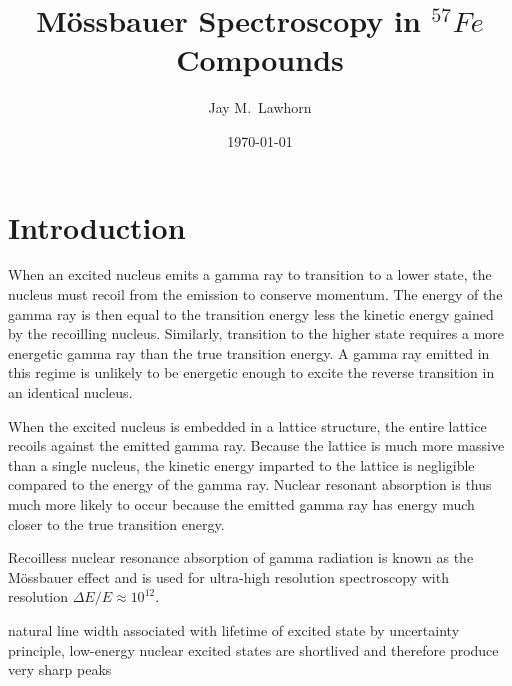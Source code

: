 \newcommand{\cd}{$\cdot$}

%
%


\title{M{\"o}ssbauer Spectroscopy in $^{57}Fe$ Compounds}
\author{Jay M.\ Lawhorn}
\date{\today}

\begin{abstract}

\end{abstract}

\maketitle


\section{Introduction}

When an excited nucleus emits a gamma ray to transition to a lower state, the nucleus must recoil from the emission to conserve momentum. The energy of the gamma ray is then equal to the transition energy less the kinetic energy gained by the recoilling nucleus. Similarly, transition to the higher state requires a more energetic gamma ray than the true transition energy. A gamma ray emitted in this regime is unlikely to be energetic enough to excite the reverse transition in an identical nucleus.

When the excited nucleus is embedded in a lattice structure, the entire lattice recoils against the emitted gamma ray. Because the lattice is much more massive than a single nucleus, the kinetic energy imparted to the lattice is negligible compared to the energy of the gamma ray. Nuclear resonant absorption is thus much more likely to occur because the emitted gamma ray has energy much closer to the true transition energy. 

Recoilless nuclear resonance absorption of gamma radiation is known as the M{\"o}ssbauer effect and is used for ultra-high resolution spectroscopy with resolution $\Delta E/E\approx10^{12}$.

natural line width associated with lifetime of excited state by uncertainty principle, low-energy nuclear excited states are shortlived and therefore produce very sharp peaks

